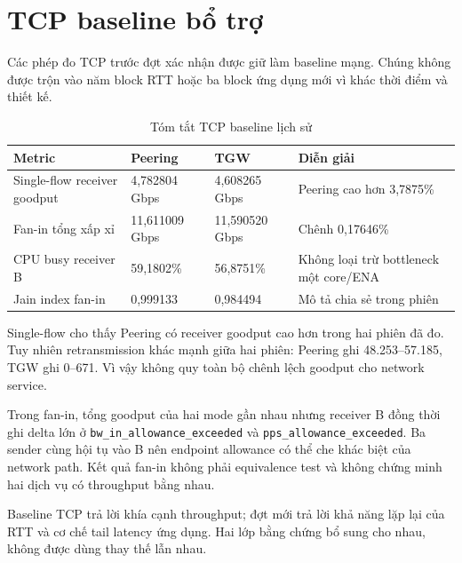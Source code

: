 \section{TCP baseline bổ trợ}

Các phép đo TCP trước đợt xác nhận được giữ làm baseline mạng. Chúng không được
trộn vào năm block RTT hoặc ba block ứng dụng mới vì khác thời điểm và thiết kế.

\begin{table}[H]
\centering
\caption{Tóm tắt TCP baseline lịch sử}
\label{tab:tcp-baseline-summary}
\small
\begin{tabularx}{\textwidth}{>{\raggedright\arraybackslash}p{}p{}p{}X}
\toprule
\textbf{Metric} & \textbf{Peering} & \textbf{TGW} & \textbf{Diễn giải} \\
\midrule
Single-flow receiver goodput & 4,782804 Gbps & 4,608265 Gbps & Peering cao hơn 3,7875\% \\
Fan-in tổng xấp xỉ & 11,611009 Gbps & 11,590520 Gbps & Chênh 0,17646\% \\
CPU busy receiver B & 59,1802\% & 56,8751\% & Không loại trừ bottleneck một core/ENA \\
Jain index fan-in & 0,999133 & 0,984494 & Mô tả chia sẻ trong phiên \\
\bottomrule
\end{tabularx}
\end{table}

Single-flow cho thấy Peering có receiver goodput cao hơn trong hai phiên đã
đo. Tuy nhiên retransmission khác mạnh giữa hai phiên: Peering ghi
48.253--57.185, TGW ghi 0--671. Vì vậy không quy toàn bộ chênh lệch goodput cho
network service.

Trong fan-in, tổng goodput của hai mode gần nhau nhưng receiver B đồng thời ghi
delta lớn ở \nolinkurl{bw_in_allowance_exceeded} và
\nolinkurl{pps_allowance_exceeded}. Ba sender cùng hội tụ vào B nên endpoint
allowance có thể che khác biệt của network path. Kết quả fan-in không phải
equivalence test và không chứng minh hai dịch vụ có throughput bằng nhau.

Baseline TCP trả lời khía cạnh throughput; đợt mới trả lời khả năng lặp lại của
RTT và cơ chế tail latency ứng dụng. Hai lớp bằng chứng bổ sung cho nhau, không
được dùng thay thế lẫn nhau.
